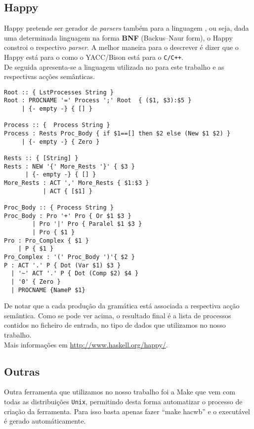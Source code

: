 \subsection{Happy}
\textsf{Happy} pretende ser gerador de \textit{parsers} também para a linguagem \haskell, ou seja, dada uma determinada linguagem na forma \textbf{BNF} (Backus–Naur form), o \textsf{Happy} constroi o respectivo \textit{parser}. A melhor maneira para o descrever é dizer que o \textsf{Happy} está para o {\haskell} como o \textsf{YACC/Bison} está para o \texttt{C/C++}.\\
De seguida apresenta-se a linguagem utilizada no para este trabalho e as respectivas acções semânticas.
\newpage
\begin{verbatim}
Root :: { LstProcesses String }
Root : PROCNAME '=' Process ';' Root  { ($1, $3):$5 }
     | {- empty -} { [] }

Process :: {  Process String }
Process : Rests Proc_Body { if $1==[] then $2 else (New $1 $2) }
     | {- empty -} { Zero }

Rests :: { [String] }
Rests : NEW '{' More_Rests '}' { $3 }
      | {- empty -} { [] }
More_Rests : ACT ',' More_Rests { $1:$3 }
           | ACT { [$1] }

Proc_Body :: { Process String }
Proc_Body : Pro '+' Pro { Or $1 $3 }
        | Pro '|' Pro { Paralel $1 $3 } 
        | Pro { $1 }
Pro : Pro_Complex { $1 }
    | P { $1 }
Pro_Complex : '(' Proc_Body ')'{ $2 }
P : ACT '.' P { Dot (Var $1) $3 }
  | '~' ACT '.' P { Dot (Comp $2) $4 }
  | '0' { Zero }
  | PROCNAME {NameP $1}
\end{verbatim}

De notar que a cada produção da gramática está associada a respectiva acção semântica. Como se pode ver acima, o resultado final é a lista de processos contidos no ficheiro de entrada, no tipo de dados que utilizamos no nosso trabalho.\\
Mais informações em \url{http://www.haskell.org/happy/}.

\subsection{Outras}
Outra ferramenta que utilizamos no nosso trabalho foi a \textsf{Make} que vem com todas as distribuições \texttt{Unix}, permitindo desta forma automatizar o processo de criação da ferramenta. Para isso basta apenas fazer ``make hacwb'' e o executável é gerado automáticamente.
